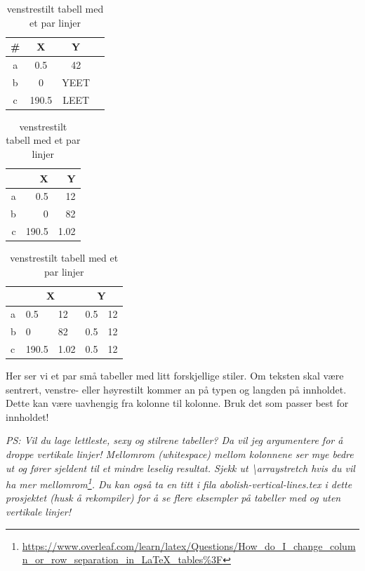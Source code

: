     
    \begin{table}[H]
            \centering
            \caption{sentrert tekst med kanter og linjer}
            \label{tab:center-tabell}
            \begin{tabular}{|c|c|c|c|}
                \hline
                \textbf{\#}  & \textbf{X}     & \textbf{Y}     \\\hline
                a   & 0.5   & 42    \\\hline
                b   & 0     & YEET  \\\hline
                c   & 190.5 & LEET  \\\hline
            \end{tabular}
        \endminipage\hfill
            \centering
            \caption{høyrestilt tekst uten kanter, en linje}
            \label{tab:høyre-tabell}
            \begin{tabular}{rrr}
                    & X     & Y     \\\hline
                a   & 0.5   & 12    \\
                b   & 0     & 82    \\
                c   & 190.5 & 1.02  
            \end{tabular}
        \endminipage\hfill
            \centering
            \caption{venstrestilt tabell med et par linjer}
            \label{tab:venstre-tabell}
            \begin{tabular}{l|llll}
                    & \multicolumn{2}{c}{X} & \multicolumn{2}{c}{Y}     \\\hline
                a   & 0.5   & 12 & 0.5   & 12   \\
                b   & 0     & 82 & 0.5   & 12   \\
                c   & 190.5 & 1.02  & 0.5   & 12
            \end{tabular}
        \endminipage\hfill
    \end{table}

    Her ser vi et par små tabeller med litt forskjellige stiler. Om teksten skal være sentrert, venstre- eller høyrestilt kommer an på typen og langden på innholdet. Dette kan være uavhengig fra kolonne til kolonne. Bruk det som passer best for innholdet!
    
    \textit{PS: Vil du lage lettleste, sexy og stilrene tabeller? Da vil jeg argumentere for å droppe vertikale linjer! Mellomrom (whitespace) mellom kolonnene ser mye bedre ut og fører sjeldent til et mindre leselig resultat. Sjekk ut \textbackslash arraystretch hvis du vil ha mer mellomrom\footnote{\protect\url{https://www.overleaf.com/learn/latex/Questions/How_do_I_change_column_or_row_separation_in_LaTeX_tables\%3F}}. Du kan også ta en titt i fila abolish-vertical-lines.tex i dette prosjektet (husk å rekompiler) for å se flere eksempler på tabeller med og uten vertikale linjer!}


